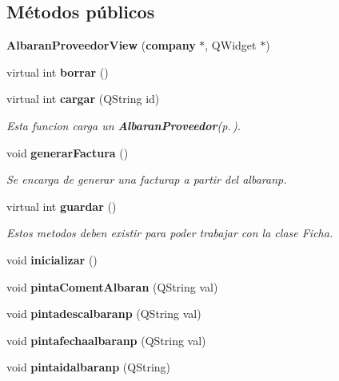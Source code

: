 \subsection*{M\'{e}todos p\'{u}blicos}
\begin{CompactItemize}
\item 
{\bf Albaran\-Proveedor\-View} ({\bf company} $\ast$, QWidget $\ast$)\label{classAlbaranProveedorView_a0}

\item 
virtual int {\bf borrar} ()\label{classAlbaranProveedorView_a1}

\item 
virtual int {\bf cargar} (QString id)\label{classAlbaranProveedorView_a2}

\begin{CompactList}\small\item\em Esta funcion carga un {\bf Albaran\-Proveedor}{\rm (p.\,\pageref{classAlbaranProveedor})}. \item\end{CompactList}\item 
void {\bf generar\-Factura} ()
\begin{CompactList}\small\item\em Se encarga de generar una facturap a partir del albaranp. \item\end{CompactList}\item 
virtual int {\bf guardar} ()\label{classAlbaranProveedorView_a4}

\begin{CompactList}\small\item\em Estos metodos deben existir para poder trabajar con la clase Ficha. \item\end{CompactList}\item 
void {\bf inicializar} ()\label{classAlbaranProveedorView_a5}

\item 
void {\bf pinta\-Coment\-Albaran} (QString val)\label{classAlbaranProveedorView_a6}

\item 
void {\bf pintadescalbaranp} (QString val)\label{classAlbaranProveedorView_a7}

\item 
void {\bf pintafechaalbaranp} (QString val)\label{classAlbaranProveedorView_a8}

\item 
void {\bf pintaidalbaranp} (QString)\label{classAlbaranProveedorView_a9}


\end{CompactItemize}
